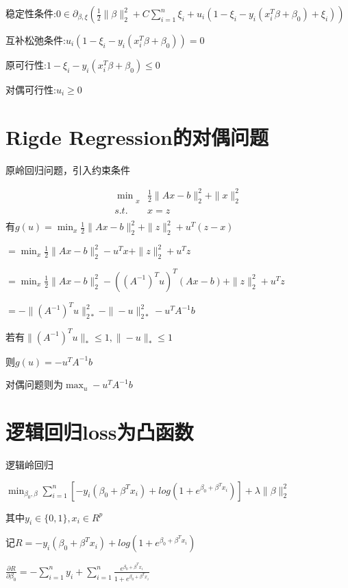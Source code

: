 \documentclass[12pt, a4paper, oneside, fontset=windows]{ctexart}
\begin{document}
稳定性条件:$0\in \partial_{\beta,\xi}(\frac{1}{2} \|\beta\|_{2}^{2} + C\sum_{i = 1}^{n} \xi_{i} + u_{i}(1-\xi_{i} -y_{i}(x_{i} ^{T}\beta +\beta_{0})+\xi_{i}))$

互补松弛条件:$u_{i}(1-\xi_{i} -y_{i}(x_{i} ^{T}\beta +\beta_{0})) = 0$

原可行性:$1-\xi_{i} -y_{i}(x_{i} ^{T}\beta +\beta_{0}) \leq 0$

对偶可行性:$u_i \geq 0$

\section{Rigde Regression的对偶问题}

原岭回归问题，引入约束条件

\begin{equation}
\begin{aligned}
        \min\underset{x}{} &\frac{1}{2} \| Ax - b\|_{2}^{2} + \| x\|_2^2 \\
        s.t. &x = z\\
\end{aligned}
\end{equation}
有$g(u) = \min_x \frac{1}{2} \|Ax -b \|_2^2 + \| z\|_2^2 + u^T(z-x)$

$=\min_x \frac{1}{2} \| Ax - b\|_2^2 - u^{T}x + \|z\|_2^2 + u^{T}z $

$=\min_x \frac{1}{2} \| Ax - b\|_2^2 - ((A^{-1})^{T}u)^T(Ax - b) +\| z\|_2^2 + u^{T}z$

$= - \| (A^{-1})^Tu\|_{2*}^2 - \| -u\|_{2*}^2 - u^TA^{-1}b$

若有$\| (A^{-1})^Tu \| _* \leq 1, \| -u\|_* \leq 1$

则$g(u) = -u^TA^{-1}b$

对偶问题则为$\max_{u} -u^TA^{-1}b$

\section{逻辑回归loss为凸函数}
逻辑岭回归

$\min_{\beta_0, \beta} \sum_{i = 1}^{n}[-y_i(\beta_0 + \beta^{T}x_i) + log(1+e^{\beta_0 + \beta^Tx_i})] + \lambda \|\beta \|_2^2$

其中$y_i \in \{ 0,1\}, x_i\in R^p$

记$R = -y_i(\beta_0 + \beta^{T}x_i) + log(1+e^{\beta_0 + \beta^Tx_i})$

$\frac{\partial R}{\partial \beta_0} = -\sum_{i = 1}^{n} y_i + \sum_{i = 1}^{n} \frac{e^{\beta_0 + \beta^Tx_i}}{1+e^{\beta_0 + \beta^Tx_i}}$
\end{document}
